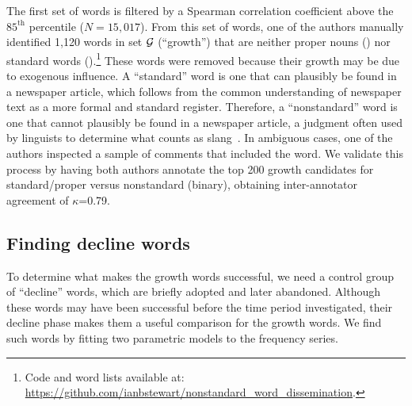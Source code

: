 The first set of words is filtered by a Spearman correlation coefficient above the $85^{\text{th}}$ percentile ($N=15,017$).
From this set of words, one of the authors manually identified 1,120 words in set $\mathcal{G}$ (``growth'') that are neither proper nouns () nor standard words ().\footnote{Code and word lists available at: \\ \url{https://github.com/ianbstewart/nonstandard_word_dissemination}.} 
These words were removed because their growth may be due to exogenous influence.
A ``standard'' word is one that can plausibly be found in a newspaper article, which follows from the common understanding of newspaper text as a more formal and standard register.
Therefore, a ``nonstandard'' word is one that cannot plausibly be found in a newspaper article, a judgment often used by linguists to determine what counts as slang~\cite{dumas1978}.
In ambiguous cases, one of the authors inspected a sample of comments that included the word.
We validate this process by having both authors annotate the top 200 growth candidates for standard/proper versus nonstandard (binary), obtaining inter-annotator agreement of $\kappa$=0.79.

\subsection{Finding decline words}
To determine what makes the growth words successful, we need a control group of ``decline'' words, which are briefly adopted and later abandoned.
Although these words may have been successful before the time period investigated, their decline phase makes them a useful comparison for the growth words. 
We find such words by fitting two parametric models to the frequency series.

